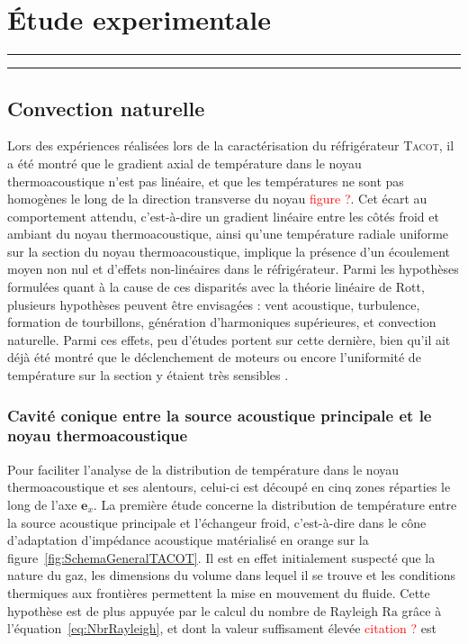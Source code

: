 \chapter{\'Etude experimentale}\label{chap:EtudeExpe}
\vfill
\hrule \vspace{.5cm}
{\hypersetup{linkcolor = black}
\localtableofcontents
}%
\vspace{.5cm} \hrule
\vfill
\clearpage

\section{Convection naturelle}\label{chap:EtudeExpe_ConvNat}
Lors des expériences réalisées lors de la caractérisation du réfrigérateur \textsc{Tacot}, il a été montré que le gradient axial de température dans le noyau thermoacoustique n'est pas linéaire, et que les températures ne sont pas homogènes le long de la direction transverse du noyau \textcolor{red}{figure ?}\cite{ramadan_design_2021}. Cet écart au comportement attendu, c'est-à-dire un gradient linéaire entre les côtés froid et ambiant du noyau thermoacoustique, ainsi qu'une température radiale uniforme sur la section du noyau thermoacoustique, implique la présence d'un écoulement moyen non nul et d'effets non-linéaires dans le réfrigérateur. Parmi les hypothèses formulées quant à la cause de ces disparités avec la théorie linéaire de Rott, plusieurs hypothèses peuvent être envisagées : vent acoustique, turbulence, formation de tourbillons, génération d'harmoniques supérieures, et convection naturelle. Parmi ces effets, peu d'études portent sur cette dernière, bien qu'il ait déjà été montré que le déclenchement de moteurs ou encore l'uniformité de température sur la section y étaient très sensibles \cite{ross_influence_2003,  hireche_numerical_2019, ramadan_experimental_2018,  zhang_novel_2011}.

\subsection{Cavité conique entre la source acoustique principale et le noyau thermoacoustique}

Pour faciliter l'analyse de la distribution de température dans le noyau thermoacoustique et ses alentours, celui-ci est découpé en cinq zones réparties le long de l'axe $\mathbf{e}_x$.
La première étude concerne la distribution de température entre la source acoustique principale et l'échangeur froid, c'est-à-dire dans le cône d'adaptation d'impédance acoustique matérialisé en orange sur la figure~\ref{fig:SchemaGeneralTACOT}. Il est en effet initialement suspecté que la nature du gaz, les dimensions du volume dans lequel il se trouve et les conditions thermiques aux frontières permettent la mise en mouvement du fluide. Cette hypothèse est de plus appuyée par le calcul du nombre de Rayleigh $\mathrm{Ra}$ grâce à l'équation~\eqref{eq:NbrRayleigh}, et dont la valeur suffisament élevée \textcolor{red}{citation ?} est

